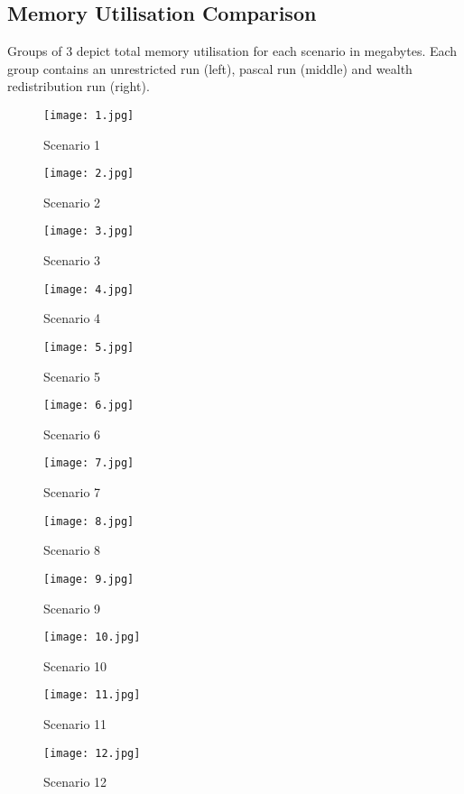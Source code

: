 \documentclass{l4proj}
\begin{document}
\begin{appendices}
\chapter{Memory Utilisation Comparison}
\label{memcmp}
Groups of 3 depict total memory utilisation for each scenario in megabytes. Each group contains an unrestricted run (left), pascal run (middle) and wealth redistribution run (right).
\begin{figure}[!ht]
  \centering
    \texttt{[image: 1.jpg]}
  \caption{Scenario 1}
\end{figure}
\begin{figure}[!ht]
  \centering
    \texttt{[image: 2.jpg]}
  \caption{Scenario 2}
\end{figure}
\begin{figure}[!ht]
  \centering
    \texttt{[image: 3.jpg]}
  \caption{Scenario 3}
\end{figure}
\begin{figure}[!ht]
  \centering
    \texttt{[image: 4.jpg]}
  \caption{Scenario 4}
\end{figure}
\begin{figure}[!ht]
  \centering
    \texttt{[image: 5.jpg]}
  \caption{Scenario 5}
\end{figure}
\begin{figure}[!ht]
  \centering
    \texttt{[image: 6.jpg]}
  \caption{Scenario 6}
\end{figure}
\begin{figure}[!ht]
  \centering
    \texttt{[image: 7.jpg]}
  \caption{Scenario 7}
\end{figure}
\begin{figure}[!ht]
  \centering
    \texttt{[image: 8.jpg]}
  \caption{Scenario 8}
\end{figure}
\begin{figure}[!ht]
  \centering
    \texttt{[image: 9.jpg]}
  \caption{Scenario 9}
\end{figure}
\begin{figure}[!ht]
  \centering
    \texttt{[image: 10.jpg]}
  \caption{Scenario 10}
\end{figure}
\begin{figure}[!ht]
  \centering
    \texttt{[image: 11.jpg]}
  \caption{Scenario 11}
\end{figure}
\begin{figure}[!ht]
  \centering
    \texttt{[image: 12.jpg]}
  \caption{Scenario 12}
\end{figure}

\end{appendices}
\end{document}
